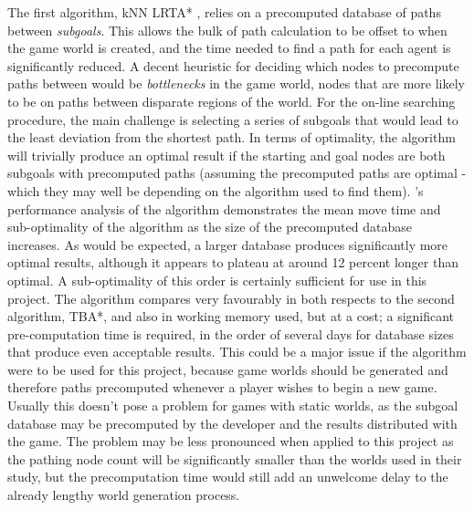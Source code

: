 \documentclass[a4paper,12pt]{article}
\begin{document}
The first algorithm, kNN LRTA* \cite{bulitko09}, relies on a precomputed database of paths between \emph{subgoals}. This allows the bulk of path calculation to be offset to when the game world is created, and the time needed to find a path for each agent is significantly reduced. A decent heuristic for deciding which nodes to precompute paths between would be \emph{bottlenecks} in the game world, nodes that are more likely to be on paths between disparate regions of the world. For the on-line searching procedure, the main challenge is selecting a series of subgoals that would lead to the least deviation from the shortest path. In terms of optimality, the algorithm will trivially produce an optimal result if the starting and goal nodes are both subgoals with precomputed paths (assuming the precomputed paths are optimal - which they may well be depending on the algorithm used to find them). 's performance analysis of the algorithm demonstrates the mean move time and sub-optimality of the algorithm as the size of the precomputed database increases. As would be expected, a larger database produces significantly more optimal results, although it appears to plateau at around 12 percent longer than optimal. A sub-optimality of this order is certainly sufficient for use in this project. The algorithm compares very favourably in both respects to the second algorithm, TBA*, and also in working memory used, but at a cost; a significant pre-computation time is required, in the order of several days for database sizes that produce even acceptable results. This could be a major issue if the algorithm were to be used for this project, because game worlds should be generated and therefore paths precomputed whenever a player wishes to begin a new game. Usually this doesn't pose a problem for games with static worlds, as the subgoal database may be precomputed by the developer and the results distributed with the game. The problem may be less pronounced when applied to this project as the pathing node count will be significantly smaller than the worlds used in their study, but the precomputation time would still add an unwelcome delay to the already lengthy world generation process.
\end{document}
